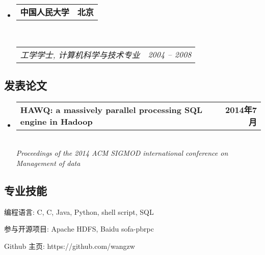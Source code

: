 \documentclass[10pt,letterpaper]{article}
\makeatletter
\newenvironment{indentsection}[1]%
{\begin{list}{}%
	{\setlength{\leftmargin}{#1}}%
	\item[]%
}
{\end{list}}
\newcommand{\headerrow}[2]
{\begin{tabular*}{\linewidth}{l@{\extracolsep{\fill}}r}
	#1 &
	#2 \\
\end{tabular*}}
\newcommand{\CPP}
{C\nolinebreak[4]\hspace{-.05em}\raisebox{.22ex}{\footnotesize\bf ++}}
\makeatother
\begin{document}
\begin{CJK}{UTF8}{gbsn}
\begin{itemize}
	\item 
	\headerrow
		{\textbf{中国人民大学}}
		{\textbf{北京}}
	\\
	\headerrow
		{\emph{工学学士, 计算机科学与技术专业}}
		{\emph{2004 -- 2008}}

\end{itemize}

\vspace{-2em}
\subsection*{发表论文}

\begin{itemize}
	\parskip=0.1em

	\item 
	\headerrow
		{\textbf{HAWQ: a massively parallel processing SQL engine in Hadoop}}
		{\textbf{2014年7月}}
	\\
	{\emph{Proceedings of the 2014 ACM SIGMOD international conference on Management of data}}
\end{itemize}

\vspace{-2em}
\subsection*{专业技能}

\begin{indentsection}{\parindent}
\begin{description*}
	\item[编程语言:]
	C, \CPP, Java, Python, shell script, SQL
	\item[参与开源项目:]
	Apache HDFS, Baidu sofa-pbrpc
	\item[Github 主页:]
	https://github.com/wangzw
\end{description*}
\end{indentsection}

\end{CJK}
\end{document}
